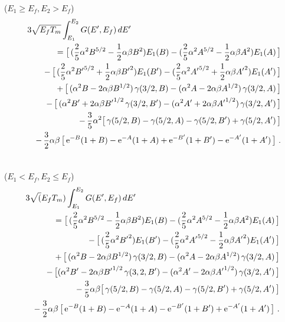 \footnotesize
\noindent{}  ($E_1 \ge E_f, E_2 > E_f$)
\begin{eqnarray}
  \lefteqn{3\sqrt{E_fT_m} \int_{E_1}^{E_2} G(E',E_f)\,dE'}\nonumber\\
  & & =\bigl[\, ({2\over 5}\alpha^2 B^{5/2}-{1\over 2}\alpha \beta B^2)
      E_1(B)-({2\over 5}\alpha^2 A^{5/2}-{1\over 2}\alpha \beta A^2)
      E_1(A) \,\bigr]\nonumber\\
  & & -\,\bigl[\,({2\over 5}\alpha^2 {B'}^{5/2}+{1\over 2}\alpha\beta {B'}^2 )
      E_1(B')-({2\over 5}\alpha^2 {A'}^{5/2}+{1\over 2}\alpha \beta {A'}^2 )
      E_1(A') \,\bigr]\nonumber\\
  & & +\,\bigl[\, (\alpha^2 B-2\alpha \beta B^{1/2})\,\gamma(3/2,B)
      -(\alpha^2 A-2 \alpha \beta A^{1/2})\,\gamma (3/2,A) \,\bigr]
      \nonumber\\
  & & -\,\bigl[\, (\alpha^2 B'+2\alpha\beta {B'}^{1/2}\,\gamma(3/2,B')
      -(\alpha^2 A'+2\alpha\beta {A'}^{1/2})\,\gamma(3/2,A')\, \bigr]
      \nonumber\\
  & & -\,{3\over 5} \alpha^2 \bigl[\, \gamma(5/2,B)-\gamma(5/2,A)
      -\gamma(5/2,B')+\gamma(5/2,A') \,\bigr]\nonumber\\
  & & -\,{3\over 2}\alpha\beta\, \bigl[\, {\rm e}^{-B}(1+B)
      -{\rm e}^{-A}(1+A)+{\rm e}^{-B'}(1+B')-{\rm e}^{-A'}(1+A')
      \,\bigr] \,\,.\nonumber\\
  \mbox{ }
\end{eqnarray}

\noindent{}  ($E_1 < E_f, E_2 \le E_f$)
  \begin{eqnarray}
  \lefteqn{3 \sqrt(E_fT_m) \int_{E_1}^{E_2} G(E',E_f)\,dE'}\nonumber\\
  & & =\bigl[\, ({2\over 5}\alpha^2 B^{5/2}-{1\over 2}\alpha\beta B^2)E_1(B)
      -({2\over 5}\alpha^2 A^{5/2}-{1\over 2}\alpha\beta A^2)E_1(A)
      \,\bigr]\nonumber\\
  & & -\,\bigl[\, ({2\over 5}\alpha^2 {B'}^2)E_1(B')-({2\over 5}\alpha^2
      {A'}^{5/2}-{1\over 2}\alpha\beta {A'}^2)E_1(A') \,\bigr]
      \nonumber\\
  & &+\,\bigl[\, (\alpha^2 B-2\alpha\beta B^{1/2})\,\gamma(3/2,B)
      -(\alpha^2 A-2\alpha\beta A^{1/2})\,\gamma(3/2,A) \,\bigr]
      \nonumber\\
  & & -\,\bigl[ (\alpha^2 B'-2\alpha\beta {B'}^{1/2}\,\gamma(3,2,B')
      -(\alpha^2 A'-2\alpha\beta {A'}^{1/2})\,\gamma(3/2,A') \,\bigr]
      \nonumber\\
  & & -\,{3\over 5}\alpha\beta\bigl[\, \gamma(5/2,B)-\gamma(5/2,A)
      -\gamma(5/2,B')+\gamma(5/2,A') \,\bigr]\nonumber\\
  & & -\,{3\over 2}\alpha\beta\,\bigl[\, {\rm e}^{-B}(1+B)
      -{\rm e}^{-A}(1+A)-{\rm e}^{-B'}(1+B')+{\rm e}^{-A'}(1+A')\,\bigr]\,\,.
      \nonumber\\
  & &\mbox{ }
\end{eqnarray}

